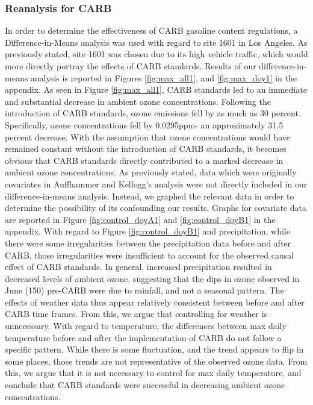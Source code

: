 \documentclass{article}
\begin{document}
\subsubsection{Reanalysis for CARB}
In order to determine the effectiveness of CARB gasoline content regulations, a Difference-in-Means analysis was used with regard to site 1601 in Los Angeles. As previously stated, site 1601 was chosen due to its high vehicle traffic, which would more directly portray the effects of CARB standards. Results of our difference-in-means analysis is reported in Figures \ref{fig:max_all1}, and \ref{fig:max_doy1} in the appendix. As seen in Figure \ref{fig:max_all1}, CARB standards led to an immediate and substantial decrease in ambient ozone concentrations. Following the introduction of CARB standards, ozone emissions fell by as much as 30 percent. Specifically, ozone concentrations fell by 0.0295ppm- an approximately 31.5 percent decrease. With the assumption that ozone concentrations would have remained constant without the introduction of CARB standards, it becomes obvious that CARB standards directly contributed to a marked decrease in ambient ozone concentrations. As previously stated, data which were originally covariates in Auffhammer and Kellogg's analysis were not directly included in our difference-in-means analysis. Instead, we graphed the relevant data in order to determine the possibility of its confounding our results. Graphs for covariate data are reported in Figure \ref{fig:control_doyA1} and \ref{fig:control_doyB1} in the appendix. With regard to Figure \ref{fig:control_doyB1} and precipitation, while there were some irregularities between the precipitation data before and after CARB, those irregularities were insufficient to account for the observed causal effect of CARB standards. In general, increased precipitation resulted in decreased levels of ambient ozone, suggesting that the dips in ozone observed in June (150) pre-CARB were due to rainfall, and not a seasonal pattern. The effects of weather data thus appear relatively consistent between before and after CARB time frames. From this, we argue that controlling for weather is unnecessary. With regard to temperature, the differences between max daily temperature before and after the implementation of CARB do not follow a specific pattern. While there is some fluctuation, and the trend appears to flip in some places, those trends are not representative of the observed ozone data. From this, we argue that it is not necessary to control for max daily temperature, and conclude that CARB standards were successful in decreasing ambient ozone concentrations.
\end{document}
